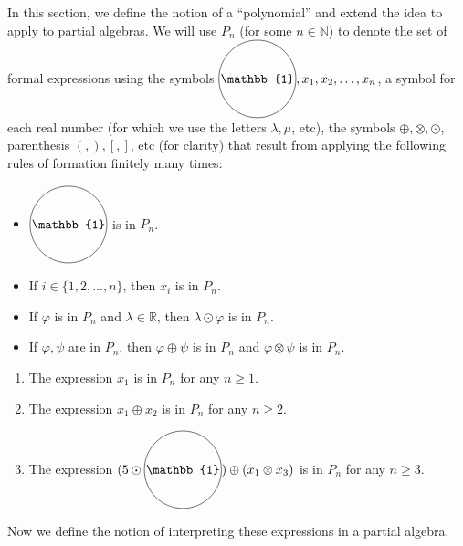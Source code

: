 \documentclass{scrartcl}
\renewcommand{\phi}{\varphi}
\newcommand{\BR}{\mathbb{R}}
\newcommand*\circled[1]{\tikz[baseline=(char.base)]{
  \node[shape=circle,draw,inner sep=1pt] (char) {#1};}}
\newcommand{\circone}{\circled{$\mathbb{1}$}}
\begin{document}
In this section, we define the notion of a ``polynomial'' and extend the idea to apply to partial algebras. We will use $P_n$ (for some $n\in\mathbb{N}$) to denote the set of formal expressions using the symbols $\circone,x_1,x_2,\ldots,x_n$, a symbol for each real number (for which we use the letters $\lambda,\mu$, etc), the symbols $\oplus,\otimes,\odot$, parenthesis $(,),[,]$, etc (for clarity) that result from applying  the following rules of formation finitely many times:

\begin{itemize}
\item $\circone$ is in $P_n$.

\item If $i\in\{1,2,\ldots,n\}$, then $x_i$ is in $P_n$.

\item If $\phi$ is in $P_n$ and $\lambda\in\BR$, then $\lambda\odot\phi$ is in $P_n$.

\item If $\phi,\psi$ are in $P_n$, then $\phi\oplus\psi$ is in $P_n$ and $\phi\otimes\psi$ is in $P_n$.
\end{itemize}

\begin{examples}\phantom{a}

\begin{enumerate}
\item The expression $x_1$ is in $P_n$ for any $n\geq1$.

\item The expression $x_1\oplus x_2$ is in $P_n$ for any $n\geq 2$.

\item The expression $(5\odot\circone)\oplus(x_1\otimes x_3)$ is in $P_n$ for any $n\geq3$.
\end{enumerate}
\end{examples}

Now we define the notion of interpreting these expressions in a partial algebra.
\end{document}
